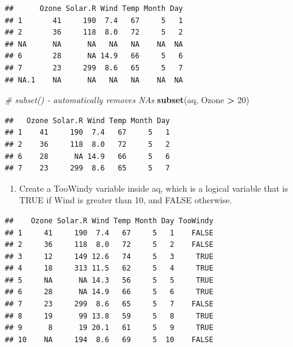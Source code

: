 \documentclass[
]{article}
\newenvironment{Shaded}{\begin{snugshade}}{\end{snugshade}}
\newcommand{\CommentTok}[1]{\textcolor[rgb]{0.56,0.35,0.01}{\textit{#1}}}
\newcommand{\DecValTok}[1]{\textcolor[rgb]{0.00,0.00,0.81}{#1}}
\newcommand{\FunctionTok}[1]{\textcolor[rgb]{0.13,0.29,0.53}{\textbf{#1}}}
\newcommand{\NormalTok}[1]{#1}
\newcommand{\OtherTok}[1]{\textcolor[rgb]{0.56,0.35,0.01}{#1}}
\newcommand{\SpecialCharTok}[1]{\textcolor[rgb]{0.81,0.36,0.00}{\textbf{#1}}}
\providecommand{\tightlist}{%
  \setlength{\itemsep}{0pt}\setlength{\parskip}{0pt}}
\begin{document}
\begin{verbatim}
##      Ozone Solar.R Wind Temp Month Day
## 1       41     190  7.4   67     5   1
## 2       36     118  8.0   72     5   2
## NA      NA      NA   NA   NA    NA  NA
## 6       28      NA 14.9   66     5   6
## 7       23     299  8.6   65     5   7
## NA.1    NA      NA   NA   NA    NA  NA
\end{verbatim}

\begin{Shaded}
\begin{Highlighting}[]
\CommentTok{\# subset() {-} automatically removes NAs}
\FunctionTok{subset}\NormalTok{(aq, Ozone }\SpecialCharTok{\textgreater{}} \DecValTok{20}\NormalTok{)}
\end{Highlighting}
\end{Shaded}

\begin{verbatim}
##   Ozone Solar.R Wind Temp Month Day
## 1    41     190  7.4   67     5   1
## 2    36     118  8.0   72     5   2
## 6    28      NA 14.9   66     5   6
## 7    23     299  8.6   65     5   7
\end{verbatim}

\begin{enumerate}
\def\labelenumi{\arabic{enumi}.}
\setcounter{enumi}{18}
\tightlist
\item
  Create a TooWindy variable inside aq, which is a logical variable that
  is TRUE if Wind is greater than 10, and FALSE otherwise.
\end{enumerate}

\begin{Shaded}
\end{Shaded}

\begin{verbatim}
##    Ozone Solar.R Wind Temp Month Day TooWindy
## 1     41     190  7.4   67     5   1    FALSE
## 2     36     118  8.0   72     5   2    FALSE
## 3     12     149 12.6   74     5   3     TRUE
## 4     18     313 11.5   62     5   4     TRUE
## 5     NA      NA 14.3   56     5   5     TRUE
## 6     28      NA 14.9   66     5   6     TRUE
## 7     23     299  8.6   65     5   7    FALSE
## 8     19      99 13.8   59     5   8     TRUE
## 9      8      19 20.1   61     5   9     TRUE
## 10    NA     194  8.6   69     5  10    FALSE
\end{verbatim}
\end{document}
